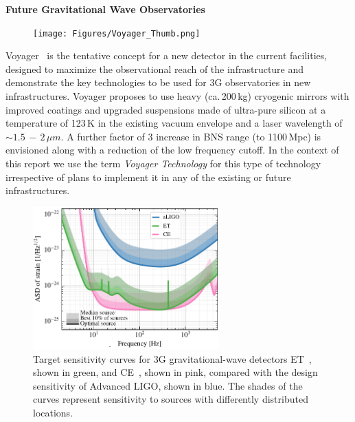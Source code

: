 \begin{DetBox}{\bf Future Gravitational Wave Observatories}
\begin{tcolorbox}[standard jigsaw,colframe=azure!70!black,colback=azure!20!white,opacityback=0.6,coltext=black, size=small, title=Voyager]
\begin{figure}
\vspace{-10pt}
\texttt{[image: Figures/Voyager\_Thumb.png]}
\label{fig:Voyager_Thumb}
\vspace{-20pt}
\end{figure}

Voyager~\cite{Voyager:Inst,VoyagerDCC2018, VoyagerDCC2019} is the tentative concept for a new detector in the current facilities, designed to maximize the observational reach of the infrastructure and demonstrate the key technologies to be used for \ac{3G} observatories in new infrastructures.
Voyager proposes to use heavy (ca.\,200\,kg) cryogenic mirrors with improved coatings and upgraded suspensions made of ultra-pure silicon at a temperature of 123\,K in the existing vacuum envelope and a laser wavelength of $\sim1.5\,-\,2\,\mu m$. 
A further factor of 3 increase in BNS range (to 1100\,Mpc) is envisioned along with a reduction of the low frequency cutoff. %
In the context of this report we use the term \emph{Voyager Technology} for this type of technology irrespective of plans to implement it in any of the existing or future infrastructures.
\end{tcolorbox}

\end{DetBox}
\newpage 


\begin{figure}
\centering
\includegraphics*[width= 0.64\textwidth]{Figures/noises_percentiles-Voyager.pdf}
\caption{Target sensitivity curves for \ac{3G} gravitational-wave detectors \acf{ET}~\cite{ET2011}, shown in green, and \acf{CE}~\cite{CosmicExplorer2017}, shown in pink, compared with the design sensitivity of Advanced LIGO, shown in blue. 
The shades of the curves represent sensitivity to sources with differently distributed locations.}
\label{fig:3GSens}
\end{figure}

